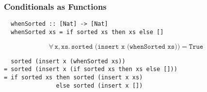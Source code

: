 \documentclass[serif,professionalfont]{beamer}
\newcommand\faa[2]{ \forall \, #1 , #2 . \,}
\newcommand\hs[1]{\texttt{#1}}
\newcommand\xs[0]{\hs{xs}}
\begin{document}
\begin{frame}[fragile]
  \frametitle{Conditionals as Functions}

  \insertlemma

\begin{verbatim}
  whenSorted :: [Nat] -> [Nat]
  whenSorted xs = if sorted xs then xs else []
\end{verbatim}

  \begin{equation*}
    \faa{\hs{x}}{\xs} \hs{sorted (insert x (whenSorted xs))} = \hs{True}
  \end{equation*}

\pause

\begin{verbatim}
  sorted (insert x (whenSorted xs))
= sorted (insert x (if sorted xs then xs else []))
= if sorted xs then sorted (insert x xs)
               else sorted (insert x [])
\end{verbatim}

\end{frame}
\end{document}
